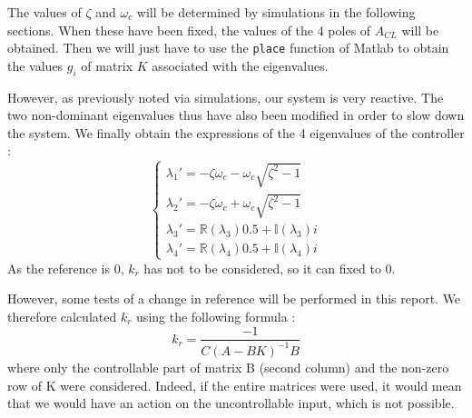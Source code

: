 The values of $\zeta$ and $\omega_c$ will be determined by simulations in the following sections. When these have been fixed, the values of the 4 poles of $A_{CL}$ will be obtained. Then we will just have to use the \texttt{place} function of Matlab to obtain the values $g_i$ of matrix $K$ associated with the eigenvalues.\par
However, as previously noted via simulations, our system is very reactive. The two non-dominant eigenvalues thus have also been modified in order to slow down the system. We finally obtain the expressions of the 4 eigenvalues of the controller :
$$
\begin{cases}
    \lambda_1' = -\zeta\omega_c - \omega_c\sqrt{\zeta^2 - 1}\\
    \lambda_2' = -\zeta\omega_c + \omega_c\sqrt{\zeta^2 - 1}\\
    \lambda_3' = \mathbb{R}(\lambda_3)0.5 + \mathbb{I}(\lambda_3)i\\
    \lambda_4' = \mathbb{R}(\lambda_4)0.5 + \mathbb{I}(\lambda_4)i
\end{cases}
$$
As the reference is 0, $k_r$ has not to be considered, so it can fixed to 0.\par
However, some tests of a change in reference will be performed in this report. We therefore calculated $k_r$ using the following formula :
$$
k_r = \frac{-1}{C(A - BK)^{-1} B}
$$
where only the controllable part of matrix B (second column) and the non-zero row of K were considered. Indeed, if the entire matrices were used, it would mean that we would have an action on the uncontrollable input, which is not possible.

